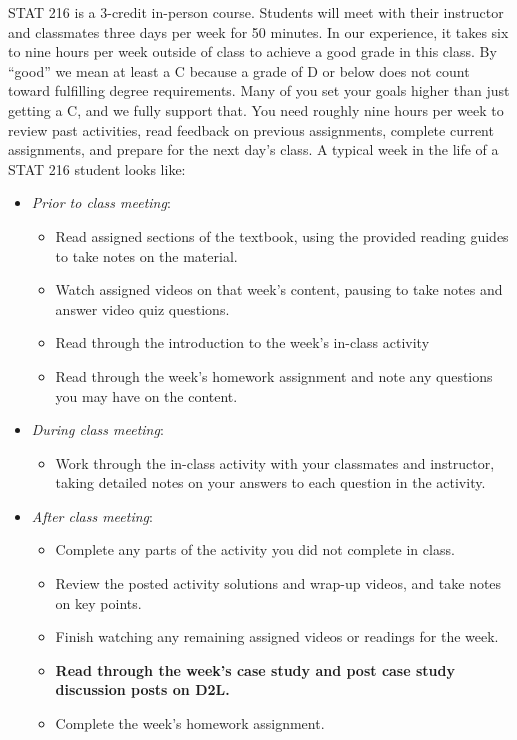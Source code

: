 \documentclass[
]{report}
\providecommand{\tightlist}{%
  \setlength{\itemsep}{0pt}\setlength{\parskip}{0pt}}
\begin{document}
STAT 216 is a 3-credit in-person course. Students will meet with their instructor and classmates three days per week for 50 minutes. In our experience, it takes six to nine hours per week outside of class to achieve a good grade in this class. By ``good'' we mean at least a C because a grade of D or below does not count toward fulfilling degree requirements. Many of you set your goals higher than just getting a C, and we fully support that. You need roughly nine hours per week to review past activities, read feedback on previous assignments, complete current assignments, and prepare for the next day's class. A typical week in the life of a STAT 216 student looks like:

\begin{itemize}
\tightlist
\item
  \emph{Prior to class meeting}:

  \begin{itemize}
  \tightlist
  \item
    Read assigned sections of the textbook, using the provided reading guides to take notes on the material.
  \item
    Watch assigned videos on that week's content, pausing to take notes and answer video quiz questions.
  \item
    Read through the introduction to the week's in-class activity
  \item
    Read through the week's homework assignment and note any questions you may have on the content.
  \end{itemize}
\item
  \emph{During class meeting}:

  \begin{itemize}
  \tightlist
  \item
    Work through the in-class activity with your classmates and instructor, taking detailed notes on your answers to each question in the activity.
  \end{itemize}
\item
  \emph{After class meeting}:

  \begin{itemize}
  \tightlist
  \item
    Complete any parts of the activity you did not complete in class.
  \item
    Review the posted activity solutions and wrap-up videos, and take notes on key points.
  \item
    Finish watching any remaining assigned videos or readings for the week.
  \item
    \textbf{Read through the week's case study and post case study discussion posts on D2L.}
  \item
    Complete the week's homework assignment.
  \end{itemize}
\end{itemize}
\end{document}
